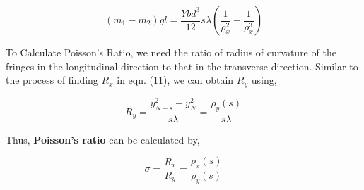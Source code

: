 \begin{equation}
    (m_1 - m_2)gl = \frac{Ybd^3}{12}s\lambda\left(\frac{1}{\rho_{x}^2}-\frac{1}{\rho_{x}^3}\right)
\end{equation}

To Calculate Poisson's Ratio, we need the ratio of radius of curvature of the fringes in the longitudinal direction to that in the transverse direction. Similar to the process of finding $R_x$ in eqn. (11), we can obtain $R_y$ using,

\begin{equation}
    R_y =  \frac{y_{N+s}^2 - y_N^2}{s\lambda} = \frac{\rho_y(s)}{s\lambda}
\end{equation}

Thus, \textbf{Poisson's ratio} can be calculated by,

\begin{equation}
    \sigma =  \frac{R_x}{R_y} = \frac{\rho_x(s)}{\rho_y(s)}
\end{equation}
